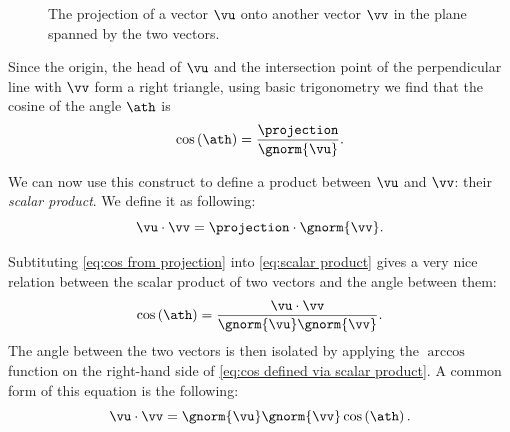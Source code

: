 \begin{figure}
	\centering
	\caption{The projection of a vector $\vu$ onto another vector $\vv$ in the plane spanned by the two vectors.}
	\label{fig:angle between two vectors in plane}
\end{figure}

Since the origin, the head of $\vu$ and the intersection point of the perpendicular line with $\vv$ form a right triangle, using basic trigonometry we find that the cosine of the angle $\ath$ is
\begin{equation}
	\cos\left(\ath\right) = \frac{\projection}{\gnorm{\vu}}.
	\label{eq:cos from projection}
\end{equation}

We can now use this construct to define a product between $\vu$ and $\vv$: their \emph{scalar product}. We define it as following:
\begin{equation}
	\vu \cdot \vv = \projection \cdot \gnorm{\vv}.
	\label{eq:scalar product}
\end{equation}

Subtituting \autoref{eq:cos from projection} into \autoref{eq:scalar product} gives a very nice relation between the scalar product of two vectors and the angle between them:
\begin{equation}
	\cos\left( \ath \right) = \frac{\vu\cdot\vv}{\gnorm{\vu}\gnorm{\vv}}.
	\label{eq:cos defined via scalar product}
\end{equation}
The angle between the two vectors is then isolated by applying the $\arccos$ function on the right-hand side of \autoref{eq:cos defined via scalar product}. A common form of this equation is the following:
\begin{equation}
	\vu\cdot\vv = \gnorm{\vu}\gnorm{\vv}\cos\left( \ath \right).
	\label{eq:scalar product via cos}
\end{equation}

